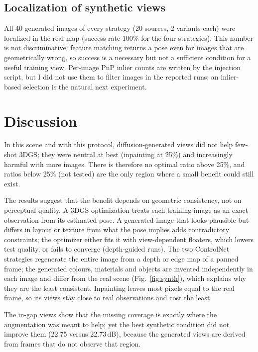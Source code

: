 \documentclass{article}
\begin{document}
\subsection{Localization of synthetic views}
All 40 generated images of every strategy (20 sources, 2 variants each) were localized in the real map
(success rate 100\% for the four strategies). This number is not discriminative: feature matching returns a
pose even for images that are geometrically wrong, so success is a necessary but not a sufficient condition for a
useful training view. Per-image PnP inlier counts are written by the injection script, but I did not use them to
filter images in the reported runs; an inlier-based selection is the natural next experiment.


\section{Discussion}

In this scene and with this protocol, diffusion-generated views did not help few-shot 3DGS; they were neutral at best
(inpainting at 25\%) and increasingly harmful with more images. There is therefore no optimal ratio above 25\%, and
ratios below 25\% (not tested) are the only region where a small benefit could still exist.

The results suggest that the benefit depends on geometric consistency, not on perceptual quality. A 3DGS optimization treats each training
image as an exact observation from its estimated pose. A generated image that looks plausible but differs in
layout or texture from what the pose implies adds contradictory constraints; the optimizer either fits it with
view-dependent floaters, which lowers test quality, or fails to converge (depth-guided runs). The two ControlNet
strategies regenerate the entire image from a depth or edge map of a panned frame; the generated colours, materials and objects
are invented independently in each image and differ from the real scene (Fig.~\ref{fig:synth}), which explains why they are the
least consistent. Inpainting leaves most pixels
equal to the real frame, so its views stay close to real observations and cost the least.

The in-gap views show that the missing coverage is exactly where the augmentation was meant to help; yet the best synthetic
condition did not improve them (22.75 versus 22.73\,dB), because the generated views are derived from frames that
do not observe that region.
\end{document}
